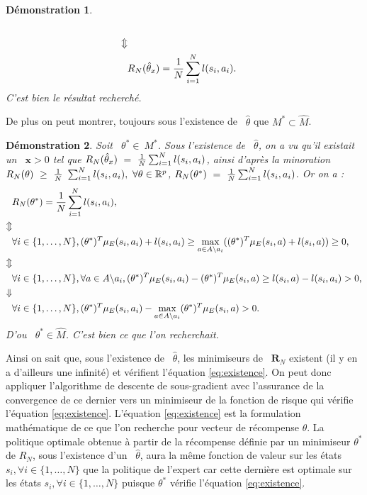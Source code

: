 \documentclass[publibook-draft]{CAp2012}
\newtheorem{preuve}{Démonstration}
\newcommand{\R}{\mathbf{R}}
\newcommand{\x}{\mathbf{x}}
\begin{document}
{\begin{preuve}
\begin{align}
\\
\nonumber\Updownarrow
\\
&R_N(\hat{\theta}_x)={1\over N} \sum_{i=1}^N l(s_i,a_i).
\end{align}
C'est bien le résultat recherché.
\end{preuve}
De plus on peut montrer, toujours sous l'existence de ~$\hat{\theta}$ que $M^*\subset\hat{M}$.
\begin{preuve}
Soit ~$\theta^*\in\ M^*$. Sous l'existence de ~$\hat{\theta}$, on a vu qu'il existait un ~$\x>0$ tel que $R_N(\hat{\theta}_x)~=~{1\over N} \sum_{i=1}^N l(s_i,a_i)$, ainsi d'après la minoration $R_N(\theta)~\geq~{1\over N}~\sum_{i=1}^Nl(s_i,a_i),~\forall \theta\in\mathbb{R}^p$, $R_N(\theta^*)~=~{1\over N} \sum_{i=1}^N l(s_i,a_i)$.
Or on a :
\begin{align}
&R_N(\theta^*)={1\over N} \sum_{i=1}^N l(s_i,a_i),
\\
\nonumber\Updownarrow
\\
&\forall i\in\{1,\dots,N\}, (\theta^*)^T\mu_E(s_i,a_i) + l(s_i,a_i)\geq\max_{a \in A \backslash a_i}((\theta^*)^T\mu_E(s_i,a)+l(s_i,a))\geq0,
\\
\nonumber\Updownarrow
\\
&\forall i\in\{1,\dots,N\},\forall a \in A \backslash a_i,  (\theta^*)^T\mu_E(s_i,a_i)-(\theta^*)^T\mu_E(s_i,a)\geq l(s_i,a)- l(s_i,a_i)>0,
\\
\nonumber\Downarrow
\\
&\forall i\in\{1,\dots,N\}, (\theta^*)^T\mu_E(s_i,a_i)-\max_{a \in A \backslash a_i}(\theta^*)^T\mu_E(s_i,a)>0.
\end{align}
D'ou ~$\theta^*\in \hat{M}$. C'est bien ce que l'on recherchait.
\end{preuve}
Ainsi on sait que, sous l'existence de ~$\hat{\theta}$, les minimiseurs de ~$\R_N$ existent (il y en a d'ailleurs une infinité) et vérifient l'équation \eqref{eq:existence}.
On peut donc appliquer l'algorithme de descente de sous-gradient avec l'assurance de la convergence de ce dernier vers un minimiseur de la fonction de risque qui vérifie l'équation \eqref{eq:existence}. L'équation \eqref{eq:existence} est la formulation mathématique de ce que l'on recherche pour vecteur de récompense $\theta$. La politique optimale obtenue à partir de la récompense définie par un minimiseur $\theta^*$ de $R_N$, sous l'existence d'un ~$\hat{\theta}$, aura la même fonction de valeur sur les états $s_i,\forall i\in\{1,\dots,N\}$ que la politique de l'expert car cette dernière est optimale sur les états $s_i,\forall i\in\{1,\dots,N\}$ puisque $\theta^*$ vérifie l'équation \eqref{eq:existence}.
}
\end{document}
